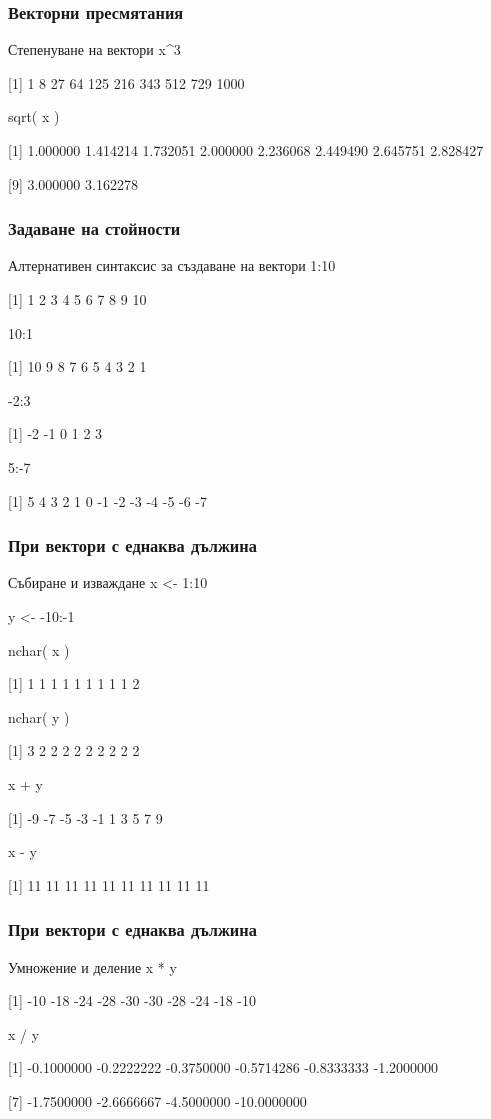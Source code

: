 \documentclass{beamer}
\begin{document}
\begin{frame}
\frametitle{Векторни пресмятания}
\begin{block}{Степенуване на вектори}
x\textasciicircum 3

[1]    1    8   27   64  125  216  343  512  729 1000

sqrt( x )

[1] 1.000000 1.414214 1.732051 2.000000 2.236068 2.449490 2.645751 2.828427

[9] 3.000000 3.162278
\end{block}
\end{frame}

\begin{frame}
\frametitle{Задаване на стойности}
\begin{block}{Алтернативен синтаксис за създаване на вектори}
1:10

[1] 1 2 3 4 5 6 7 8 9 10

10:1

[1] 10 9 8 7 6 5 4 3 2 1

-2:3

[1] -2 -1 0 1 2 3

5:-7

[1] 5 4 3 2 1 0 -1 -2 -3 -4 -5 -6 -7
\end{block}
\end{frame}

\begin{frame}
\frametitle{При вектори с еднаква дължина}
\begin{block}{Събиране и изваждане}
x <- 1:10

y <- -10:-1

nchar( x )

[1] 1 1 1 1 1 1 1 1 1 2

nchar( y )

[1] 3 2 2 2 2 2 2 2 2 2

x + y

[1] -9 -7 -5 -3 -1  1  3  5  7  9

x - y

[1] 11 11 11 11 11 11 11 11 11 11
\end{block}
\end{frame}

\begin{frame}
\frametitle{При вектори с еднаква дължина}
\begin{block}{Умножение и деление}
x * y

[1] -10 -18 -24 -28 -30 -30 -28 -24 -18 -10

x / y

[1]  -0.1000000  -0.2222222  -0.3750000  -0.5714286  -0.8333333  -1.2000000

[7]  -1.7500000  -2.6666667  -4.5000000 -10.0000000
\end{block}
\end{frame}
\end{document}
